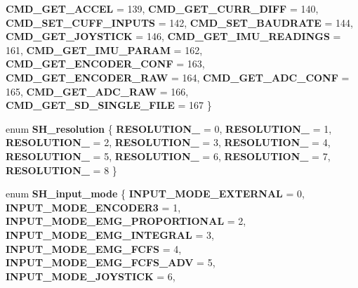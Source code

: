 \begin{DoxyCompactItemize}
\textbf{ C\+M\+D\+\_\+\+G\+E\+T\+\_\+\+A\+C\+C\+EL} = 139, 
\newline
\textbf{ C\+M\+D\+\_\+\+G\+E\+T\+\_\+\+C\+U\+R\+R\+\_\+\+D\+I\+FF} = 140, 
\textbf{ C\+M\+D\+\_\+\+S\+E\+T\+\_\+\+C\+U\+F\+F\+\_\+\+I\+N\+P\+U\+TS} = 142, 
\textbf{ C\+M\+D\+\_\+\+S\+E\+T\+\_\+\+B\+A\+U\+D\+R\+A\+TE} = 144, 
\textbf{ C\+M\+D\+\_\+\+G\+E\+T\+\_\+\+J\+O\+Y\+S\+T\+I\+CK} = 146, 
\newline
\textbf{ C\+M\+D\+\_\+\+G\+E\+T\+\_\+\+I\+M\+U\+\_\+\+R\+E\+A\+D\+I\+N\+GS} = 161, 
{\bfseries C\+M\+D\+\_\+\+G\+E\+T\+\_\+\+I\+M\+U\+\_\+\+P\+A\+R\+AM} = 162, 
{\bfseries C\+M\+D\+\_\+\+G\+E\+T\+\_\+\+E\+N\+C\+O\+D\+E\+R\+\_\+\+C\+O\+NF} = 163, 
{\bfseries C\+M\+D\+\_\+\+G\+E\+T\+\_\+\+E\+N\+C\+O\+D\+E\+R\+\_\+\+R\+AW} = 164, 
\newline
{\bfseries C\+M\+D\+\_\+\+G\+E\+T\+\_\+\+A\+D\+C\+\_\+\+C\+O\+NF} = 165, 
{\bfseries C\+M\+D\+\_\+\+G\+E\+T\+\_\+\+A\+D\+C\+\_\+\+R\+AW} = 166, 
{\bfseries C\+M\+D\+\_\+\+G\+E\+T\+\_\+\+S\+D\+\_\+\+S\+I\+N\+G\+L\+E\+\_\+\+F\+I\+LE} = 167
 \}
\item 
\mbox{\label{commands_8h_a929dcdf4fe183d585367c2aa05b57765}} 
enum {\bfseries S\+H\+\_\+resolution} \{ \newline
{\bfseries R\+E\+S\+O\+L\+U\+T\+I\+O\+N\+\_} = 0, 
{\bfseries R\+E\+S\+O\+L\+U\+T\+I\+O\+N\+\_} = 1, 
{\bfseries R\+E\+S\+O\+L\+U\+T\+I\+O\+N\+\_} = 2, 
{\bfseries R\+E\+S\+O\+L\+U\+T\+I\+O\+N\+\_} = 3, 
\newline
{\bfseries R\+E\+S\+O\+L\+U\+T\+I\+O\+N\+\_} = 4, 
{\bfseries R\+E\+S\+O\+L\+U\+T\+I\+O\+N\+\_} = 5, 
{\bfseries R\+E\+S\+O\+L\+U\+T\+I\+O\+N\+\_} = 6, 
{\bfseries R\+E\+S\+O\+L\+U\+T\+I\+O\+N\+\_} = 7, 
\newline
{\bfseries R\+E\+S\+O\+L\+U\+T\+I\+O\+N\+\_} = 8
 \}
\item 
enum \textbf{ S\+H\+\_\+input\+\_\+mode} \{ \newline
\textbf{ I\+N\+P\+U\+T\+\_\+\+M\+O\+D\+E\+\_\+\+E\+X\+T\+E\+R\+N\+AL} = 0, 
\textbf{ I\+N\+P\+U\+T\+\_\+\+M\+O\+D\+E\+\_\+\+E\+N\+C\+O\+D\+E\+R3} = 1, 
\textbf{ I\+N\+P\+U\+T\+\_\+\+M\+O\+D\+E\+\_\+\+E\+M\+G\+\_\+\+P\+R\+O\+P\+O\+R\+T\+I\+O\+N\+AL} = 2, 
\textbf{ I\+N\+P\+U\+T\+\_\+\+M\+O\+D\+E\+\_\+\+E\+M\+G\+\_\+\+I\+N\+T\+E\+G\+R\+AL} = 3, 
\newline
\textbf{ I\+N\+P\+U\+T\+\_\+\+M\+O\+D\+E\+\_\+\+E\+M\+G\+\_\+\+F\+C\+FS} = 4, 
\textbf{ I\+N\+P\+U\+T\+\_\+\+M\+O\+D\+E\+\_\+\+E\+M\+G\+\_\+\+F\+C\+F\+S\+\_\+\+A\+DV} = 5, 
\textbf{ I\+N\+P\+U\+T\+\_\+\+M\+O\+D\+E\+\_\+\+J\+O\+Y\+S\+T\+I\+CK} = 6, 

\end{DoxyCompactItemize}
